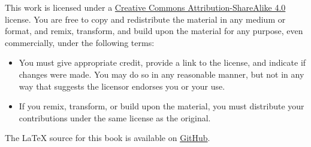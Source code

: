 \noindent \footnotesize This work is licensed under a \href{https://creativecommons.org/licenses/by-sa/4.0/}{Creative Commons Attribution-ShareAlike 4.0} license. 
You are free to copy and redistribute the material in any medium or format, and  remix, transform, and build upon the material for any purpose, even commercially, under the following terms:
\begin{itemize}
\item You must give appropriate credit, provide a link to the license, and indicate if changes were made. You may do so in any reasonable manner, but not in any way that suggests the licensor endorses you or your use.
\item If you remix, transform, or build upon the material, you must distribute your contributions under the same license as the original.
\end{itemize}

\vfill\noindent
The \LaTeX{} source for this book is available
on \href{https://github.com/catrincm/forallx-bris/}{GitHub}. 


%
\normalsize 
